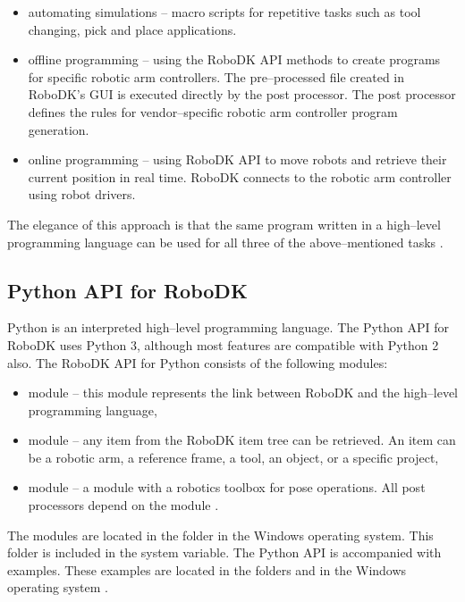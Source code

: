 \begin{itemize}
    
 \item automating simulations -- macro scripts for repetitive tasks such as tool changing, pick and place applications.

 \item offline programming -- using the RoboDK API methods to create programs for specific robotic arm controllers. The pre--processed  file created in RoboDK's GUI is executed directly by the post processor. The post processor defines the rules for vendor--specific robotic arm controller program generation. 

 \item online programming -- using RoboDK API to move robots and retrieve their current position in real time. RoboDK connects to the robotic arm controller using robot drivers.

\end{itemize}
The elegance of this approach is that the same program written in a high--level programming language can be used for all three of the above--mentioned tasks \cite{robodkapi}. 

\subsection{Python API for RoboDK}

Python is an interpreted high--level programming language. The Python API for RoboDK uses Python 3, although most features are compatible with Python 2 also. The RoboDK API for Python consists of the following modules:

\begin{itemize}
    \item {} module -- this module represents the link between RoboDK and the high--level programming language,
    \item {} module -- any item from the RoboDK item tree can be retrieved.  An item can be a robotic arm, a reference frame, a tool, an object, or a specific project,
    \item {} module -- a module with a robotics toolbox for pose operations. All post processors depend on the  module .
\end{itemize}

The modules are located in the folder   in the Windows operating system. This folder is included in the  system variable. The Python API is accompanied with examples. These examples are located in the folders \newline {} and    in the Windows operating system \cite{robodkapipython}.

